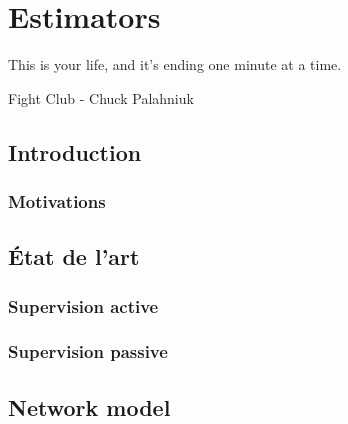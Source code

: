 
\chapter{Estimators} %
\label{cha:estimators}

\epigraph{This is your life, and it's ending one minute at a time.}{Fight Club - Chuck Palahniuk}

\minitoc

\section{Introduction} %
\label{sec:estimators_introduction}

\lipsum

\subsection{Motivations} %
\label{sub:motivations}

\lipsum



\section{État de l'art} %
\label{sec:_tat_de_l_art}

\lipsum

\subsection{Supervision active} %
\label{sub:supervision_active}

\lipsum


\subsection{Supervision passive} %
\label{sub:supervision_passive}



\section{Network model} %
\label{sec:estimators_network_model}

